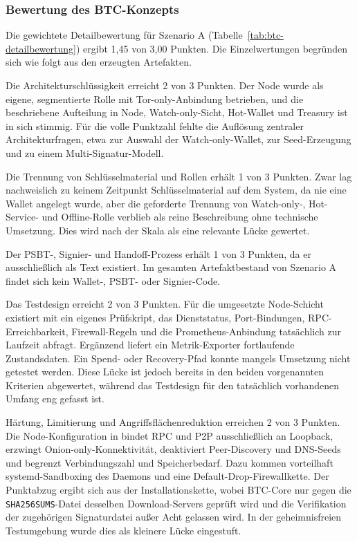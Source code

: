 \subsubsection{Bewertung des \ac{BTC}-Konzepts}

Die gewichtete Detailbewertung für Szenario A (Tabelle~\ref{tab:btc-detailbewertung}) ergibt 1{,}45 von 3{,}00 Punkten. Die Einzelwertungen begründen sich wie folgt aus den erzeugten Artefakten.

Die Architekturschlüssigkeit erreicht 2 von 3 Punkten. Der Node wurde als eigene, segmentierte Rolle mit Tor-only-Anbindung betrieben, und die beschriebene Aufteilung in Node, Watch-only-Sicht, Hot-Wallet und Treasury ist in sich stimmig. Für die volle Punktzahl fehlte die Auflösung zentraler Architekturfragen, etwa zur Auswahl der Watch-only-Wallet, zur Seed-Erzeugung und zu einem Multi-Signatur-Modell.

Die Trennung von Schlüsselmaterial und Rollen erhält 1 von 3 Punkten. Zwar lag nachweislich zu keinem Zeitpunkt Schlüsselmaterial auf dem System, da nie eine Wallet angelegt wurde, aber die geforderte Trennung von Watch-only-, Hot-Service- und Offline-Rolle verblieb als reine Beschreibung ohne technische Umsetzung. Dies wird nach der Skala als eine relevante Lücke gewertet.

Der \ac{PSBT}-, Signier- und Handoff-Prozess erhält 1 von 3 Punkten, da er ausschließlich als Text existiert. Im gesamten Artefaktbestand von Szenario A findet sich kein Wallet-, \ac{PSBT}- oder Signier-Code.

Das Testdesign erreicht 2 von 3 Punkten. Für die umgesetzte Node-Schicht existiert mit  ein eigenes Prüfskript, das Dienststatus, Port-Bindungen, \ac{RPC}-Erreichbarkeit, Firewall-Regeln und die Prometheus-Anbindung tatsächlich zur Laufzeit abfragt. Ergänzend liefert ein Metrik-Exporter fortlaufende Zustandsdaten. 
Ein Spend- oder Recovery-Pfad konnte mangels Umsetzung nicht getestet werden. Diese Lücke ist jedoch bereits in den beiden vorgenannten Kriterien abgewertet, während das Testdesign für den tatsächlich vorhandenen Umfang eng gefasst ist.

Härtung, Limitierung und Angriffsflächenreduktion erreichen 2 von 3 Punkten. Die Node-Konfiguration in  bindet \ac{RPC} und \ac{P2P} ausschließlich an Loopback, erzwingt Onion-only-Konnektivität, deaktiviert Peer-Discovery und \ac{DNS}-Seeds und begrenzt Verbindungszahl und Speicherbedarf. Dazu kommen vorteilhaft systemd-Sandboxing des Daemons und eine Default-Drop-Firewallkette. 
Der Punktabzug ergibt sich aus der Installationskette, wobei \ac{BTC}-Core nur gegen die \texttt{SHA256SUMS}-Datei desselben Download-Servers geprüft wird und die Verifikation der zugehörigen Signaturdatei außer Acht gelassen wird. In der geheimnisfreien Testumgebung wurde dies als kleinere Lücke eingestuft.

